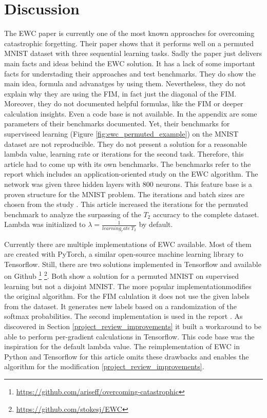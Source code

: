 \chapter{Discussion}

The EWC paper is currently one of the most known approaches for overcoming catastrophic forgetting.
Their paper shows that it performs well on a permuted MNIST dataset with three sequential learning tasks.
\newline
Sadly the paper just delivers main facts and ideas behind the EWC solution.
It has a lack of some important facts for understading their approaches and test benchmarks.
They do show the main idea, formula and advanatges by using them.
Nevertheless, they do not explain why they are using the FIM, in fact just the diagonal of the FIM.
Moreover, they do not documented helpful formulas, like the FIM or deeper calculation insights.
Even a code base is not available.
In the appendix are some parameters of their benchmarks documented.
Yet, their benchmarks for superviseed learning (Figure \ref{fig:ewc_permuted_example}) on the MNIST dataset are not reproducible.
They do not present a solution for a reasonable lambda value, learning rate or iterations for the second task.
Therefore, this article had to come up with its own benchmarks.
The benchmarks refer to the report \cite{cf_application_oriented_study} which includes an application-oriented study on the EWC algorithm.
The network was given three hidden layers with 800 neurons.
This feature base is a proven structure for the MNIST problem.
The iterations and batch sizes are chosen from the study \cite{cf_application_oriented_study}.
This article increased the iterations for the permuted benchmark to analyze the surpassing of the $T_2$ accuracy to the complete dataset.
Lambda was initialized to $\lambda = \frac{1}{learning_rate \: T_2}$ by default.

Currently there are multiple implementations of EWC available.
Most of them are created with PyTorch, a similar open-source machine learning library to Tensorflow.
Still, there are two solutions implemented in Tensorflow and available on Github
\footnote[1]{\url{https://github.com/ariseff/overcoming-catastrophic}}
\footnote[2]{\url{https://github.com/stokesj/EWC}}.
Both show a solution for a permuted MNIST on supervised learning but not a disjoint MNIST.
The more popular implementation\footnotemark[1] modifies the original algorithm.
For the FIM calulation it does not use the given labels from the dataset.
It generates new labels based on a randomization of the softmax probabilities.
The second implementation \footnotemark[2] is used in the report \cite{cf_application_oriented_study}.
As discovered in Section \ref{project_review_improvements} it built a workaround to be able to perform per-gradient calculations in Tensorflow.
This code base was the inspiration for the default lambda value.
\newline
The reimplementation of EWC in Python and Tensorflow for this article omits these drawbacks and enables the algorithm for the modification \ref{project_review_improvements}.

